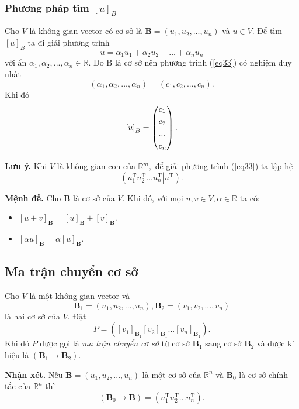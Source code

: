 \subsubsection{Phương pháp tìm ${\left[ u \right]_B}$}
Cho $V$ là không gian vector có cơ sở là $\mathbf{B} = \left( {{u_1},{u_2},...,{u_n}} \right)$ và $u \in V.$ Để tìm ${\left[ u \right]_B}$ ta đi giải phương trình
\begin{equation}
u = {\alpha _1}{u_1} + {\alpha _2}{u_2} + ... + {\alpha _n}{u_n}
\label{eq33}
\end{equation}
với ẩn $\alpha_1, \alpha_2, ..., \alpha_n \in \mathbb{R}.$ Do $\mathrm{B}$ là cơ sở nên phương trình (\ref{eq33}) có nghiệm duy nhất
$$\left( {{\alpha _1},{\alpha _2},...,{\alpha _n}} \right) = \left( {{c_1},{c_2},...,{c_n}} \right).$$
Khi đó 
$${\left[ u \right]_B} = \left( \begin{gathered}
  {c_1} \hfill \\
  {c_2} \hfill \\
  ... \hfill \\
  {c_n} \hfill \\ 
\end{gathered}  \right).$$
\begin{mybox}
\textbf{Lưu ý.} Khi $V$ là không gian con của $\mathbb{R}^m,$ để giải phương trình (\ref{eq33}) ta lập hệ
$$\left( {u_1^{\mathrm{T}}u_2^{\mathrm{T}}...\left. {u_n^{\mathrm{T}}} \right|{u^{\mathrm{T}}}} \right).$$
\end{mybox}
\begin{mybox}
\textbf{Mệnh đề.} Cho $\mathbf{B}$ là cơ sở của $V.$ Khi đó, với mọi $u, v \in V, \alpha \in \mathbb{R}$ ta có:
\begin{itemize}
\item ${\left[ {u + v} \right]_{\mathbf{B}}} = {\left[ u \right]_{\mathbf{B}}} + {\left[ v \right]_{\mathbf{B}}}.$
\item ${\left[ {\alpha u} \right]_{\mathbf{B}}} = \alpha {\left[ u \right]_{\mathbf{B}}}.$
\end{itemize}
\end{mybox}
\subsection{Ma trận chuyển cơ sở}
Cho $V$ là một không gian vector và
$${\mathbf{B}_1} = \left( {{u_1},{u_2},...,{u_n}} \right),{\mathbf{B}_2} = \left( {{v_1},{v_2},...,{v_n}} \right)$$
là hai cơ sở của $V.$ Đặt
$$P = \left( {{{\left[ {{v_1}} \right]}_{\mathbf{B}_1}}{{\left[ {{v_2}} \right]}_{\mathbf{B}_1}}...{{\left[ {{v_n}} \right]}_{\mathbf{B}_1}}} \right).$$
Khi đó $P$ được gọi là \textit{ma trận chuyển cơ sở} từ cơ sở $\mathbf{B}_1$ sang cơ sở $\mathbf{B}_2$ và được kí hiệu là $\left( {\mathbf{B}_1 \to \mathbf{B}_2} \right).$
\begin{mybox}
\textbf{Nhận xét.} Nếu ${\mathbf{B}} = \left( {{u_1},{u_2},...,{u_n}} \right)$ là một cơ sở của $\mathbb{R}^n$ và $\mathbf{B}_0$ là cơ sở chính tắc của $\mathbb{R}^n$ thì
$$\left( {{\mathbf{B}_0} \to \mathbf{B}} \right) = \left( {u_1^{\mathrm{T}}u_2^{\mathrm{T}}...u_n^{\mathrm{T}}} \right).$$
\end{mybox}
